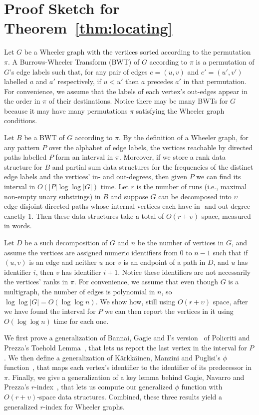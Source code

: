 
\appendix

\section{Proof Sketch for Theorem~\ref{thm:locating}}
\label{app:locating}

Let $G$ be a Wheeler graph with the vertices sorted according to the permutation~$\pi$.  A Burrows-Wheeler Transform (BWT) of $G$ according to $\pi$ is a permutation of $G$'s edge labels such that, for any pair of edges $e = (u, v)$ and $e' = (u', v')$ labelled $a$ and $a'$ respectively, if $u < u'$ then $a$ precedes $a'$ in that permutation.  For convenience, we assume that the labels of each vertex's out-edges appear in the order in $\pi$ of their destinations.  Notice there may be many BWTs for $G$ because it may have many permutations $\pi$ satisfying the Wheeler graph conditions.

Let $B$ be a BWT of $G$ according to $\pi$.  By the definition of a Wheeler graph, for any pattern $P$ over the alphabet of edge labels, the vertices reachable by directed paths labelled $P$ form an interval in $\pi$.  Moreover, if we store a rank data structure for $B$ and partial sum data structures for the frequencies of the distinct edge labels and the vertices' in- and out-degrees, then given $P$ we can find its interval in $O (|P| \log \log |G|)$ time.  Let $r$ is the number of runs (i.e., maximal non-empty unary substrings) in $B$ and suppose $G$ can be decomposed into $\upsilon$ edge-disjoint directed paths whose internal vertices each have in- and out-degree exactly 1.  Then these data  structures take a total of $O (r + \upsilon)$ space, measured in words.

Let $D$ be a such decomposition of $G$ and $n$ be the number of vertices in $G$, and assume the vertices are assigned numeric identifiers from 0 to $n - 1$ such that if $(u, v)$ is an edge and neither $u$ nor $v$ is an endpoint of a path in $D$, and $u$ has identifier $i$, then $v$ has identifier $i + 1$.  Notice these identifiers are not necessarily the vertices' ranks in $\pi$.  For convenience, we assume that even though $G$ is a multigraph, the number of edges is polynomial in $n$, so $\log \log |G| = O (\log \log n)$.  We show how, still using $O (r + \upsilon)$ space, after we have found the interval for $P$ we can then report the vertices in it using $O (\log \log n)$ time for each one.

We first prove a generalization of Bannai, Gagie and I's version~\cite{bannai2020refining} of Policriti and Prezza's Toehold Lemma~\cite{policriti2018lz77}, that lets us report the last vertex in the interval for $P$.  We then define a generalization of K\"arkk\"ainen, Manzini and Puglisi's $\phi$ function~\cite{karkkainen2009permuted}, that maps each vertex's identifier to the identifier of its predecessor in $\pi$.  Finally, we give a generalization of a key lemma behind Gagie, Navarro and Prezza's $r$-index~\cite{gagie2020fully}, that lets us compute our generalized $\phi$ function with $O (r + \upsilon)$-space data structures.  Combined, these three results yield a generalized $r$-index for Wheeler graphs.

